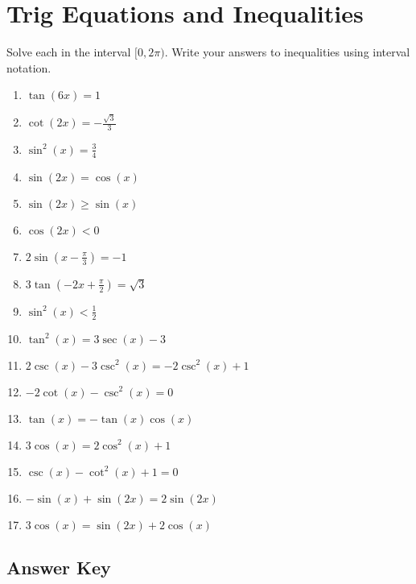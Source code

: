 \chapter{Trig Equations and Inequalities}

Solve each in the interval $[0,2\pi)$. Write your answers to inequalities using interval notation.

\begin{enumerate}
	\item $\tan(6x) = 1$
    \item $\cot(2x) = -\frac{\sqrt{3}}{3}$
    \item $\sin^2 (x) = \frac{3}{4}$
    \item $\sin(2x) = \cos(x)$
    \item $\sin(2x) \geq \sin(x)$
    \item $\cos(2x) < 0$
    \item $2\sin\left(x-\frac{\pi}{3}\right) = -1$
    \item $3\tan\left(-2x+\frac{\pi}{2}\right)=\sqrt{3}$
    \item $\sin^2(x) < \frac{1}{2}$
    
    \item $\tan^2(x) = 3\sec(x) - 3$
    \item $2\csc(x) - 3\csc^2(x) = -2\csc^2(x) + 1$
    \item $-2\cot(x) - \csc^2(x) = 0$
    \item $\tan(x) = -\tan(x)\cos(x)$
    \item $3\cos(x) = 2\cos^2(x) + 1$
    \item $\csc(x) - \cot^2(x) + 1 = 0$
    \item $-\sin(x) + \sin(2x) = 2\sin(2x)$
    \item $3\cos(x) = \sin(2x) + 2\cos(x)$
\end{enumerate}

\newpage

\section{Answer Key}

